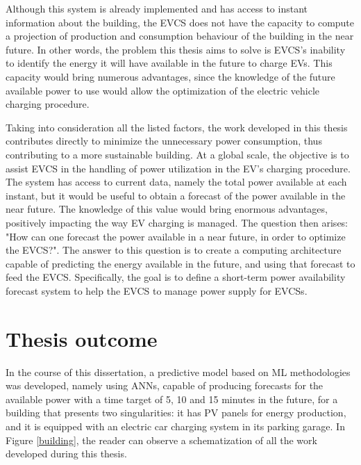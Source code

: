 Although this system is already implemented and has access to instant information about the building, the \ac{EVCS} does not have the capacity to compute a projection of production and consumption behaviour of the building in the near future. In other words, the problem this thesis aims to solve is \ac{EVCS}'s inability to identify the energy it will have available in the future to charge \ac{EV}s. This capacity would bring numerous advantages, since the knowledge of the future available power to use would allow the optimization of the electric vehicle charging procedure.


Taking into consideration all the listed factors, the work developed in this thesis contributes directly to minimize the unnecessary power consumption, thus contributing to a more sustainable building. At a global scale, the objective is to assist \ac{EVCS} in the handling of power utilization in the  \ac{EV}'s charging procedure. The system has access to current data, namely the total power available at each instant, but it would be useful to obtain a forecast of the power available in the near future. The knowledge of this value would bring enormous advantages, positively impacting the way \ac{EV} charging is managed. The question then arises: "How can one forecast the power available in a near future, in order to optimize the \ac{EVCS}?". The answer to this question is to create a computing architecture capable of predicting the energy available in the future, and using that forecast to feed the \ac{EVCS}. Specifically, the goal is to define a short-term power availability forecast system to help the \ac{EVCS} to manage power supply for \ac{EVCSs}. 





\section{Thesis outcome}

In the course of this dissertation, a predictive model based on \ac{ML} methodologies was developed, namely using \ac{ANNs}, capable of producing forecasts for the available power with a time target of 5, 10 and 15 minutes in the future, for a building that presents two singularities: it has \ac{PV} panels for energy production, and it is equipped with an electric car charging system in its parking garage. In Figure \ref{building}, the reader can observe a schematization of all the work developed during this thesis. 

